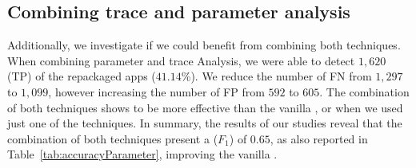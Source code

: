 \subsection{Combining trace and parameter analysis}

Additionally, we investigate if we could benefit from combining both techniques. When combining parameter and trace Analysis, we were able to detect $1,620$ (TP) of the repackaged apps ($41.14$\%). We reduce the number of FN from $1,297$ to $1,099$, however increasing the number of FP from $592$ to $605$. The combination of both techniques shows to be more effective than the vanilla \mas, or when we used just one of the techniques. In summary, the results of our studies reveal that the combination of both techniques present a ($F_1$) of $0.65$, as also reported in Table~\ref{tab:accuracyParameter}, improving the vanilla \mas.

